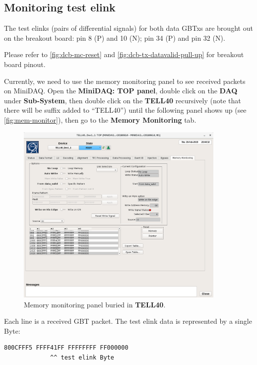 \subsection{Monitoring test elink}
The test elinks (pairs of differential signals) for both data GBTxs are brought
out on the breakout board: pin 8 (P) and 10 (N); pin 34 (P) and pin 32 (N).

Please refer to
\autoref{fig:dcb-mc-reset} and \autoref{fig:dcb-tx-datavalid-pull-up} for
breakout board pinout.

Currently, we need to use the memory monitoring panel to see received packets on
MiniDAQ. Open the \textbf{MiniDAQ: TOP panel}, double click on the
\textbf{DAQ} under \textbf{Sub-System}, then double click on the \textbf{TELL40}
recursively (note that there will be suffix added to ``TELL40'') until the
following panel shows up (see \autoref{fig:mem-monitor}), then go to the
\textbf{Memory Monitoring} tab.

\begin{figure}[ht]
    \centering
    \includegraphics[width=0.9\textwidth]{res/memory_monitoring_panel.png}
    \caption{Memory monitoring panel buried in \textbf{TELL40}.}
    \label{fig:mem-monitor}
\end{figure}

Each line is a received GBT packet. The test elink data is represented by a
single Byte:

\begin{lstlisting}
800CFFF5 FFFF41FF FFFFFFFF FF000000
             ^^ test elink Byte
\end{lstlisting}
